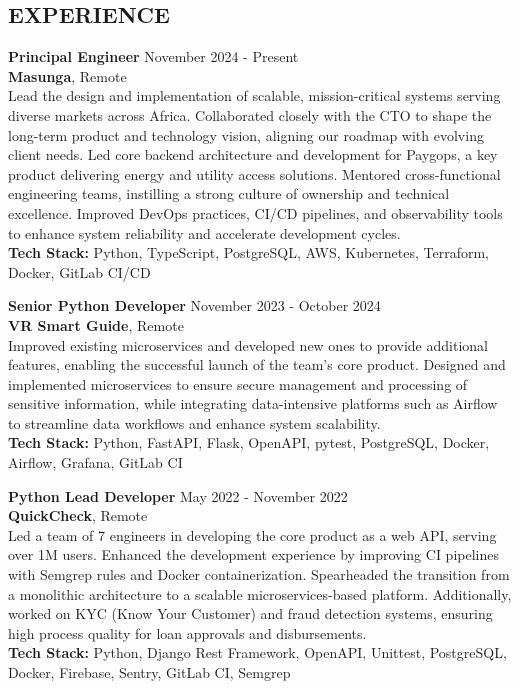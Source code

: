 \documentclass[margin, 10pt]{res} %
\begin{document}
\begin{resume}
    \section{EXPERIENCE}

    \textbf{Principal Engineer} \hfill November 2024 - Present\\
    \textbf{Masunga}, Remote\\
    Lead the design and implementation of scalable, mission-critical systems serving diverse markets across Africa. Collaborated closely with the CTO to shape the long-term product and technology vision, aligning our roadmap with evolving client needs. Led core backend architecture and development for Paygops, a key product delivering energy and utility access solutions. Mentored cross-functional engineering teams, instilling a strong culture of ownership and technical excellence. Improved DevOps practices, CI/CD pipelines, and observability tools to enhance system reliability and accelerate development cycles.\\
    \textbf{Tech Stack:} Python, TypeScript, PostgreSQL, AWS, Kubernetes, Terraform, Docker, GitLab CI/CD


    \textbf{Senior Python Developer} \hfill November 2023 - October 2024\\
    \textbf{VR Smart Guide}, Remote\\
    Improved existing microservices and developed new ones to provide additional features, enabling the successful launch of the team's core product. Designed and implemented microservices to ensure secure management and processing of sensitive information, while integrating data-intensive platforms such as Airflow to streamline data workflows and enhance system scalability.\\
    \textbf{Tech Stack:} Python, FastAPI, Flask, OpenAPI, pytest, PostgreSQL, Docker, Airflow, Grafana, GitLab CI

    \textbf{Python Lead Developer} \hfill May 2022 - November 2022\\
    \textbf{QuickCheck}, Remote\\
    Led a team of 7 engineers in developing the core product as a web API, serving over 1M users. Enhanced the development experience by improving CI pipelines with Semgrep rules and Docker containerization. Spearheaded the transition from a monolithic architecture to a scalable microservices-based platform. Additionally, worked on KYC (Know Your Customer) and fraud detection systems, ensuring high process quality for loan approvals and disbursements.\\
    \textbf{Tech Stack:} Python, Django Rest Framework, OpenAPI, Unittest, PostgreSQL, Docker, Firebase, Sentry, GitLab CI, Semgrep



\end{resume}
\end{document}
